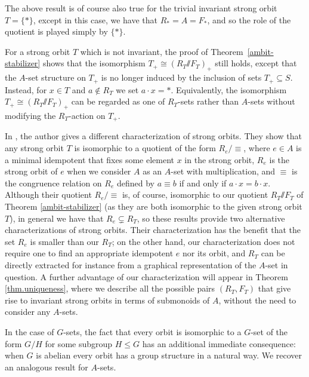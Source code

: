 \documentclass[11pt]{amsart}
\renewcommand{\ss}{\mathord{\sslash}}
\begin{document}
\begin{remark}
    The above result is of course also true for the trivial invariant strong orbit $T=\{*\}$, except in this case, we have that $R_*=A=F_*$, and so the role of the quotient is played simply by $\{*\}$. 
\end{remark}

\begin{remark}%
    For a strong orbit $T$ which is not invariant, the proof of Theorem~\ref{ambit-stabilizer} shows that the isomorphism $T_+\cong (R_T\ss F_T)_+$ still holds, except that the $A$-set structure on $T_+$ is no longer induced by the inclusion of sets $T_+ \subseteq S$. Instead, for $x \in T$ and $a \notin R_T$ we set $a \cdot x = *$. Equivalently, the isomorphism $T_+\cong (R_T\ss F_T)_+$ can be regarded as one of $R_T$-sets rather than $A$-sets without modifying the $R_T$-action on $T_+$.
\end{remark}

\begin{remark}
    In \cite[Proposition 3.1]{burnside}, the author gives a different characterization of strong orbits. They show that any strong orbit $T$ is isomorphic to a quotient of the form $R_e/\equiv$, where $e\in A$ is a minimal idempotent that fixes some element $x$ in the strong orbit, $R_e$ is the strong orbit of $e$ when we consider $A$ as an $A$-set with multiplication, and $\equiv$ is the congruence relation on $R_e$ defined by $a\equiv b$ if and only if $a\cdot x=b\cdot x$. Although their quotient $R_e/\equiv$ is, of course, isomorphic to our quotient $R_T\ss F_T$ of Theorem \ref{ambit-stabilizer} (as they are both isomorphic to the given strong orbit $T$), in general we have that $R_e\subsetneq R_T$, so these results provide two alternative characterizations of strong orbits. Their characterization has the benefit that the set $R_e$ is smaller than our $R_T$; on the other hand, our characterization does not require one to find an appropriate idempotent $e$ nor its orbit, and $R_T$ can be directly extracted for instance from a graphical representation of the $A$-set in question. A further advantage of our characterization will appear in Theorem \ref{thm.uniqueness}, where we describe all the possible pairs $(R_T, F_T)$ that give rise to invariant strong orbits in terms of submonoids of $A$, without the need to consider any $A$-sets.
\end{remark}

In the case of $G$-sets, the fact that every orbit is isomorphic to a $G$-set of the form $G/H$ for some subgroup $H\leq G$ has an additional immediate consequence: when $G$ is abelian every orbit has a group structure in a natural way. We recover an analogous result for $A$-sets.
\end{document}

